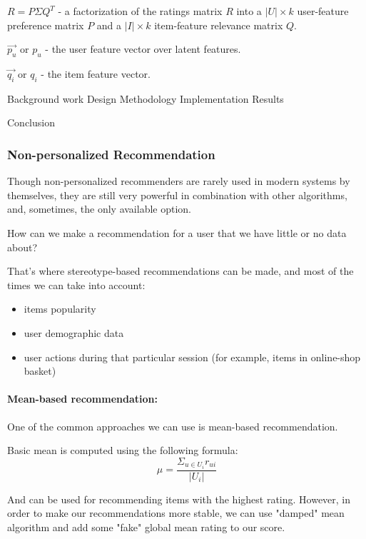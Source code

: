 \documentclass[11pt]{article}
\providecommand{\tightlist}{%
      \setlength{\itemsep}{0pt}\setlength{\parskip}{0pt}}
\begin{document}
\(R = P\Sigma Q^{T}\) - a factorization of the ratings matrix \(R\) into
a \(|U| \times k\) user-feature preference matrix \(P\) and a
\(|I| \times k\) item-feature relevance matrix \(Q\).

\(\vec{p_{u}}\) or \(p_{u}\) - the user feature vector over latent
features.

\(\vec{q_{i}}\) or \(q_{i}\) - the item feature vector.

    Background work Design Methodology Implementation Results

Conclusion

    \subsubsection{Non-personalized
Recommendation}\label{non-personalized-recommendation}

    Though non-personalized recommenders are rarely used in modern systems
by themselves, they are still very powerful in combination with other
algorithms, and, sometimes, the only available option.

How can we make a recommendation for a user that we have little or no
data about?

That's where stereotype-based recommendations can be made, and most of
the times we can take into account:

\begin{itemize}
\tightlist
\item
  items popularity
\item
  user demographic data
\item
  user actions during that particular session (for example, items in
  online-shop basket)
\end{itemize}

    \paragraph{Mean-based recommendation:}\label{mean-based-recommendation}

    One of the common approaches we can use is mean-based recommendation.

Basic mean is computed using the following formula:
\[\mu = \frac{\Sigma_{u \in U_{i}}r_{ui}}{|U_{i}|}\]

    And can be used for recommending items with the highest rating. However,
in order to make our recommendations more stable, we can use "damped"
mean algorithm and add some "fake" global mean rating to our score.
\end{document}
